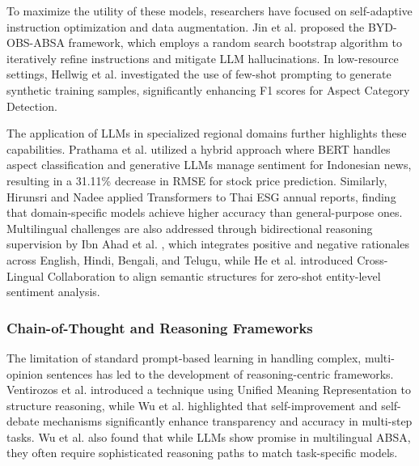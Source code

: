 \documentclass{article}
\begin{document}
To maximize the utility of these models, researchers have focused on self-adaptive instruction optimization and data augmentation. Jin et al.  \parencite{weiqiang_jin_5ccfa531} proposed the BYD-OBS-ABSA framework, which employs a random search bootstrap algorithm to iteratively refine instructions and mitigate LLM hallucinations. In low-resource settings, Hellwig et al.  \parencite{nils_constantin_hellwig_6fa4e097} investigated the use of few-shot prompting to generate synthetic training samples, significantly enhancing F1 scores for Aspect Category Detection.

The application of LLMs in specialized regional domains further highlights these capabilities. Prathama et al.  \parencite{ubaidillah_ariq_prathama_a1856e2f} utilized a hybrid approach where BERT handles aspect classification and generative LLMs manage sentiment for Indonesian news, resulting in a 31.11\% decrease in RMSE for stock price prediction. Similarly, Hirunsri and Nadee  \parencite{tharnsaithong_hirunsri_e4c4d75b} applied Transformers to Thai ESG annual reports, finding that domain-specific models achieve higher accuracy than general-purpose ones. Multilingual challenges are also addressed through bidirectional reasoning supervision by Ibn Ahad et al.  \parencite{association_for_computational_linguistics_2025_1ba46dee}, which integrates positive and negative rationales across English, Hindi, Bengali, and Telugu, while He et al.  \parencite{association_for_computational_linguistics_2025_5a25f994} introduced Cross-Lingual Collaboration to align semantic structures for zero-shot entity-level sentiment analysis.
\subsubsection{Chain-of-Thought and Reasoning Frameworks}

The limitation of standard prompt-based learning in handling complex, multi-opinion sentences has led to the development of reasoning-centric frameworks. Ventirozos et al.  \parencite{filippos_ventirozos_5976f1ad} introduced a technique using Unified Meaning Representation to structure reasoning, while Wu et al.  \parencite{chengyan_wu_4c659eab} highlighted that self-improvement and self-debate mechanisms significantly enhance transparency and accuracy in multi-step tasks. Wu et al.  \parencite{chengyan_wu_4c659eab} also found that while LLMs show promise in multilingual ABSA, they often require sophisticated reasoning paths to match task-specific models.
\end{document}
